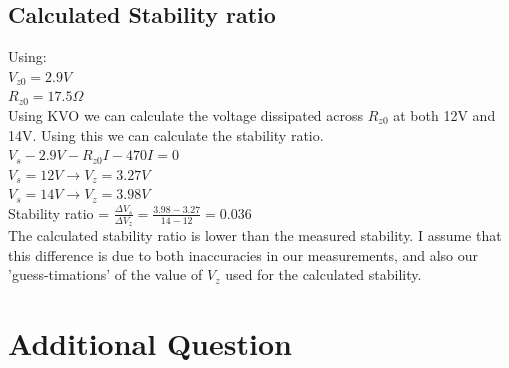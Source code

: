 \documentclass[a4paper,11pt]{article}
\begin{document}
\subsection{Calculated Stability ratio}
Using:\\
$V_{z0} = 2.9V$\\
$R_{z0} = 17.5 \Omega $\\

Using KVO we can calculate the voltage dissipated across $R_{z0}$ at both 12V and 14V. Using this we can calculate the stability ratio.\\
$V_{s}-2.9V-R_{z0}I-470I = 0$\\
$V_s = 12V \rightarrow V_z =3.27V$\\
$V_s = 14V \rightarrow V_z =3.98V$\\
Stability ratio = $\frac{\Delta V_s}{\Delta V_z} = \frac{3.98-3.27}{14-12} = 0.036$\\

The calculated stability ratio is lower than the measured stability. I assume that this difference is due to both inaccuracies in our measurements, and also our 'guess-timations' of the value of $V_{z}$ used for the calculated stability.

\section{Additional Question}
\begin{figure}[h]
\centering
{}
\caption{}
\end{figure}
\end{document}
